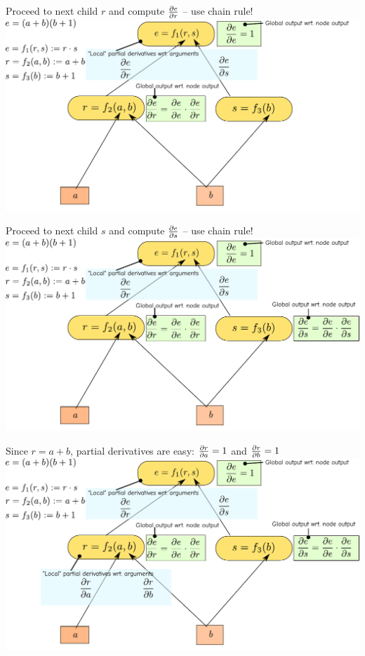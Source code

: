 \documentclass[12pt,aspectratio=169,handout]{beamer}
\begin{document}
\begin{frame}{Proceed to next child $r$ and compute $\pdv{e}{r}$ -- use chain rule!}
	\includegraphics[width=1.1\linewidth]{img/backprop05.pdf}
	
	
\end{frame}

\begin{frame}{Proceed to next child $s$ and compute $\pdv{e}{s}$ -- use chain rule!}
	\includegraphics[width=1.1\linewidth]{img/backprop06.pdf}
\end{frame}

\begin{frame}{Since $r = a + b$, partial derivatives are easy: $\pdv{r}{a} = 1$ and $\pdv{r}{b} = 1$}
	\includegraphics[width=1.1\linewidth]{img/backprop07.pdf}
\end{frame}
\end{document}
